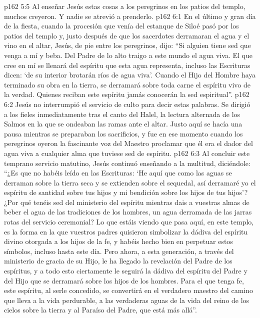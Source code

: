 \vs p162 5:5 \pc Al enseñar Jesús estas cosas a los peregrinos en los patios del templo, muchos creyeron. Y nadie se atrevió a prenderlo.
\vs p162 6:1 En el último y gran día de la fiesta, cuando la procesión que venía del estanque de Siloé pasó por los patios del templo y, justo después de que los sacerdotes derramaran el agua y el vino en el altar, Jesús, de pie entre los peregrinos, dijo: “Si alguien tiene sed que venga a mí y beba. Del Padre de lo alto traigo a este mundo el agua viva. El que cree en mí se llenará del espíritu que esta agua representa, incluso las Escrituras dicen: ‘de su interior brotarán ríos de agua viva’. Cuando el Hijo del Hombre haya terminado su obra en la tierra, se derramará sobre toda carne el espíritu vivo de la verdad. Quienes reciban este espíritu jamás conocerán la sed espiritual”.
\vs p162 6:2 Jesús no interrumpió el servicio de culto para decir estas palabras. Se dirigió a los fieles inmediatamente tras el canto del Halel, la lectura alternada de los Salmos en la que se ondeaban las ramas ante el altar. Justo aquí se hacía una pausa mientras se preparaban los sacrificios, y fue en ese momento cuando los peregrinos oyeron la fascinante voz del Maestro proclamar que él era el dador del agua viva a cualquier alma que tuviese sed de espíritu.
\vs p162 6:3 Al concluir este temprano servicio matutino, Jesús continuó enseñando a la multitud, diciéndole: “¿Es que no habéis leído en las Escrituras: ‘He aquí que como las aguas se derraman sobre la tierra seca y se extienden sobre el sequedal, así derramaré yo el espíritu de santidad sobre tus hijos y mi bendición sobre los hijos de tus hijos’? ¿Por qué tenéis sed del ministerio del espíritu mientras dais a vuestras almas de beber el agua de las tradiciones de los hombres, un agua derramada de las jarras rotas del servicio ceremonial? Lo que estáis viendo que pasa aquí, en este templo, es la forma en la que vuestros padres quisieron simbolizar la dádiva del espíritu divino otorgada a los hijos de la fe, y habéis hecho bien en perpetuar estos símbolos, incluso hasta este día. Pero ahora, a esta generación, a través del ministerio de gracia de su Hijo, le ha llegado la revelación del Padre de los espíritus, y a todo esto ciertamente le seguirá la dádiva del espíritu del Padre y del Hijo que se derramará sobre los hijos de los hombres. Para el que tenga fe, este espíritu, al serle concedido, se convertirá en el verdadero maestro del camino que lleva a la vida perdurable, a las verdaderas aguas de la vida del reino de los cielos sobre la tierra y al Paraíso del Padre, que está más allá”.
